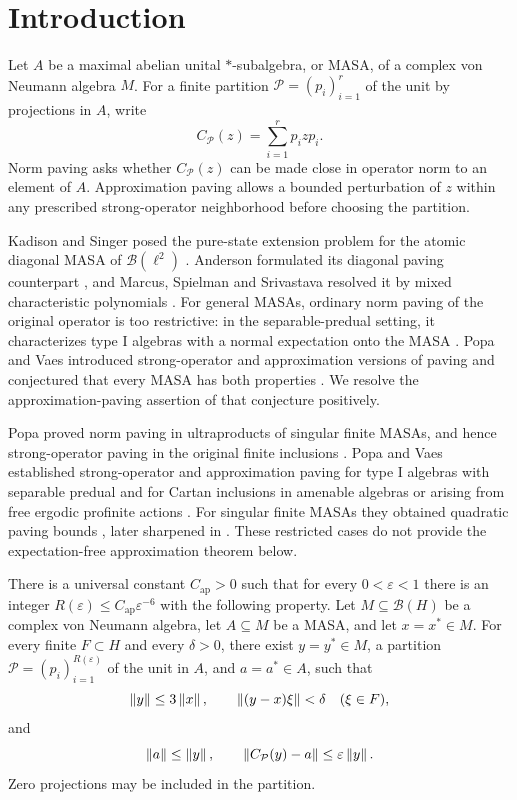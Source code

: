 \section{Introduction}\label{sec:introduction}

Let \(A\) be a maximal abelian unital \(*\)-subalgebra, or MASA, of a
complex von Neumann algebra \(M\).
For a finite partition \(\mathcal P=(p_i)_{i=1}^r\) of the unit by
projections in \(A\), write
\[
 C_{\mathcal P}(z)=\sum_{i=1}^r p_i z p_i .
\]
Norm paving asks whether \(C_{\mathcal P}(z)\) can be made close in
operator norm to an element of \(A\). Approximation paving allows a
bounded perturbation of \(z\) within any prescribed strong-operator
neighborhood before choosing the partition.

Kadison and Singer posed the pure-state extension problem for the atomic
diagonal MASA of \(\mathcal B(\ell^2)\) \cite{KS59}. Anderson formulated its
diagonal paving counterpart \cite{Anderson79}, and Marcus, Spielman and
Srivastava resolved it by mixed characteristic polynomials \cite{MSS15}.
For general MASAs, ordinary norm paving of the original operator is too
restrictive: in the separable-predual setting, it characterizes type I
algebras with a normal expectation onto the MASA
\cite[Theorem~3.3]{PV15}. Popa and Vaes introduced strong-operator and
approximation versions of paving and conjectured that every MASA has
both properties \cite[Definitions~2.2--2.3 and Conjecture~2.8(1)]{PV15}.
We resolve the approximation-paving assertion of that conjecture positively.

Popa proved norm paving in ultraproducts of singular finite MASAs,
and hence strong-operator paving in the original finite inclusions
\cite{Popa14}. Popa and Vaes established strong-operator and approximation
paving for type I algebras with separable predual and for Cartan
inclusions in amenable algebras or arising from free ergodic profinite
actions \cite[Sections~3--4]{PV15}. For singular finite MASAs they
obtained quadratic paving bounds \cite[Theorem~5.1]{PV15}, later
sharpened in \cite{PV16}. These restricted cases do not provide the
expectation-free approximation theorem below.

\begin{theorem}\label{thm:main}
There is a universal constant \(C_{\mathrm{ap}}>0\) such that for every
\(0<\varepsilon<1\) there is an integer
\(R(\varepsilon)\leq C_{\mathrm{ap}}\varepsilon^{-6}\)
with the following property.
Let \(M\subseteq\mathcal B(H)\) be a complex von Neumann algebra,
let \(A\subseteq M\) be a MASA, and let \(x=x^*\in M\).
For every finite \(F\subset H\) and every \(\delta>0\), there exist
\(y=y^*\in M\), a partition \(\mathcal P=(p_i)_{i=1}^{R(\varepsilon)}\)
of the unit in \(A\), and \(a=a^*\in A\), such that
\[
 \left\lVert y\right\rVert\leq3\left\lVert x\right\rVert,\qquad
 \left\lVert(y-x)\xi\right\rVert<\delta\quad(\xi\in F),
\]
and
\[
 \left\lVert a\right\rVert\leq\left\lVert y\right\rVert,\qquad
 \left\lVert C_{\mathcal P}(y)-a\right\rVert\leq\varepsilon\left\lVert y\right\rVert.
\]
Zero projections may be included in the partition.
\end{theorem}

